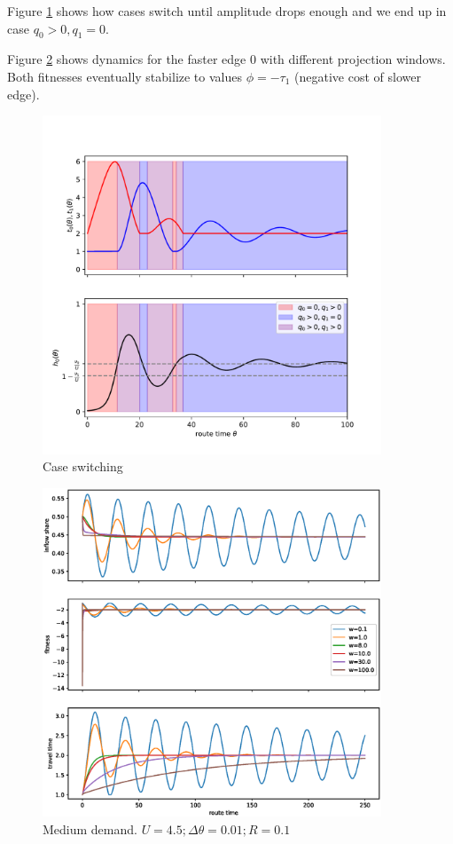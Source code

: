 \documentclass[12pt]{article}
\begin{document}
Figure \ref{fig:case_switching} shows how cases switch until amplitude drops enough and we end up in case $q_0 > 0, q_1 = 0$.

Figure \ref{fig:replicator_medium_demand} shows dynamics for the faster edge 0 with different projection windows. 
Both fitnesses eventually stabilize to values $\phi = -\tau_1$ (negative cost of slower edge).

\begin{figure}
	\includegraphics[width=0.9\textwidth]{img/case_switching.pdf}
	\caption{ Case switching }
	\label{fig:case_switching}
\end{figure}


\begin{figure}
	\includegraphics[width=0.9\textwidth]{img/replicator_medium_demand.eps}
	\caption{ Medium demand. $U = 4.5; \Delta\theta = 0.01; R = 0.1$ }
	\label{fig:replicator_medium_demand}

\end{figure}
\end{document}
